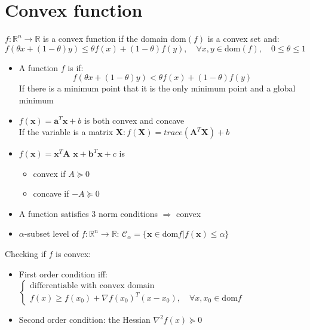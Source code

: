 \section{Convex function}
 $f: \mathbb{R}^n \rightarrow \mathbb{R}$ is a convex function if the domain dom$(f)$ is a convex set and:
\[ f(\theta x + (1-\theta)y) \leq \theta f(x) + (1-\theta) f(y), \quad \forall x, y \in \text{dom}(f),\quad 0\leq\theta\leq1 \]

\begin{itemize}
	\item A function $f$ is  if:
	\[ f(\theta x + (1-\theta)y) < \theta f(x) + (1-\theta) f(y)\]
	If there is a minimum point that it is the only minimum point and a global minimum
	\item {} $f(\textbf{x}) = \textbf{a}^T\textbf{x}+b$ is both convex and concave\\
	If the variable is a matrix $\textbf{X}: f(\textbf{X}) = trace(\textbf{A}^T \textbf{X}) + b$
	\item {} $f(\textbf{x}) = \textbf{x}^T \textbf{A x} + \textbf{b}^T \textbf{x} + c$ is
	\begin{itemize}
		\item convex if $A \succeq 0$
		\item concave if $-A \succeq 0$
	\end{itemize}
	\item A function satisfies 3 norm conditions $\Rightarrow$ convex
	\item $\alpha$-subset level of $f: \mathbb{R}^n \rightarrow \mathbb{R}$: $\mathcal{C}_\alpha = \{ \textbf{x} \in \text{dom}f | f(\textbf{x}) \leq \alpha \}$
\end{itemize}

Checking if $f$ is convex:
\begin{itemize}
	\item First order condition \ac{iff}: $\begin{cases}
		\text{differentiable with convex domain}\\
		f(x) \geq f(x_0) + \nabla f(x_0)^T(x-x_0), \quad \forall x, x_0 \in \text{dom}f
	\end{cases}$
	\item Second order condition: the Hessian $\nabla^2f(x) \succeq 0$
\end{itemize}